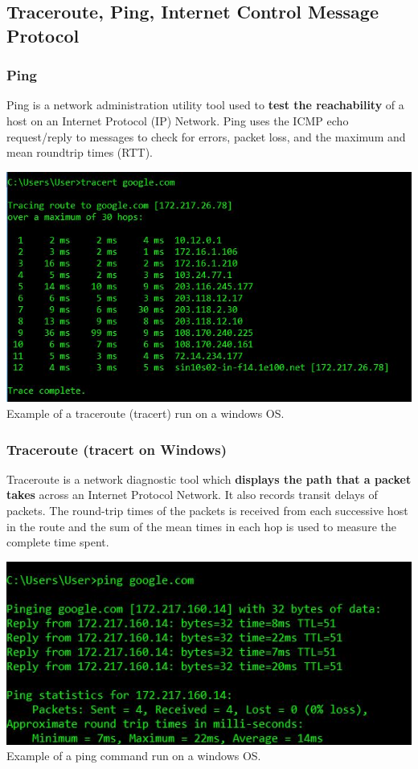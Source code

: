 \documentclass{article}
\begin{document}
\subsection{Traceroute, Ping, Internet Control Message Protocol}

\subsubsection{Ping}
Ping is a network administration utility tool used to \textbf{test the reachability} of a host on an Internet Protocol (IP) Network. Ping uses the ICMP echo request/reply to messages to check for errors, packet loss, and the maximum and mean roundtrip times (RTT).

\begin{center}
\includegraphics[width=\textwidth]{tracertexample.JPG}
Example of a traceroute (tracert) run on a windows OS. 
\end{center}

\subsubsection{Traceroute (tracert on Windows)}
Traceroute is a network diagnostic tool which \textbf{displays the path that a packet takes} across an Internet Protocol Network. It also records transit delays of packets. The round-trip times of the packets is received from each successive host in the route and the sum of the mean times in each hop is used to measure the complete time spent.

\begin{center}
\includegraphics[width=\textwidth]{PingExample.JPG}
Example of a ping command run on a windows OS.
\end{center}
\end{document}
